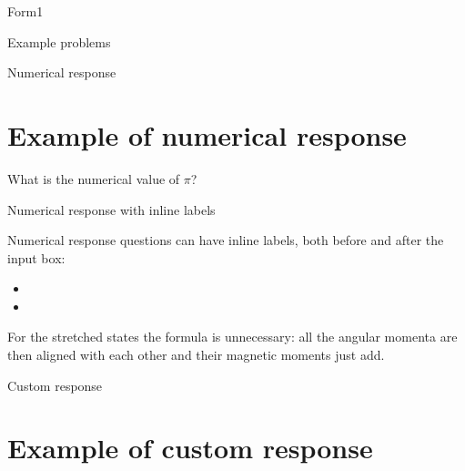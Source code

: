 \begin{edXchapter}{Form1}
\begin{edXsection}{Example problems}
\begin{edXvertical}
\begin{edXproblem}{Numerical response}
\section{Example of numerical response}  

What is the numerical value of $\pi$?


\end{edXproblem}


\begin{edXproblem}{Numerical response with inline labels}{}

Numerical response questions can have inline labels, both before and after the input box:

\begin{itemize}

\item  

     

\item  

     

\end{itemize}

\begin{edXsolution}

For the stretched states the formula is unnecessary: all the angular momenta are
then aligned with each other and their magnetic moments just add. 

\end{edXsolution}

\end{edXproblem}

\end{edXvertical}


\begin{edXvertical}


\begin{edXproblem}{Custom response}

\section{Example of custom response}  


\end{edXproblem}
\end{edXvertical}
\end{edXsection}
\end{edXchapter}
